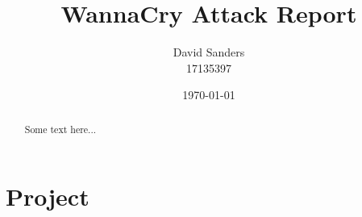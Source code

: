 \documentclass[12pt]{article}
\title{WannaCry Attack Report}
\author{David Sanders\\17135397}
\date{\today}
\begin{document}
\maketitle

\begin{abstract}
Some text here...
\end{abstract}

\section{Project}

\pagebreak

\end{document}
